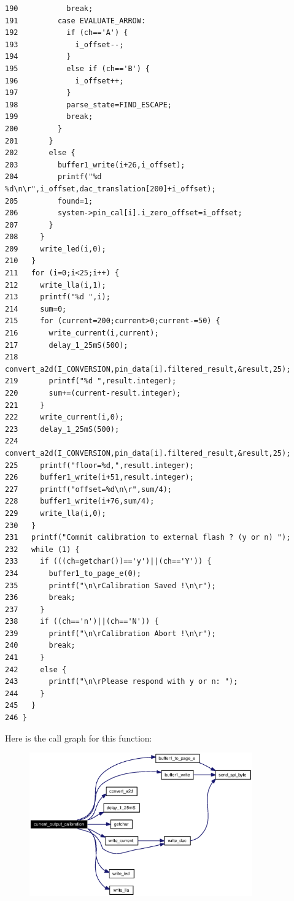 \begin{verbatim}
190           break;
191         case EVALUATE_ARROW: 
192           if (ch=='A') {
193             i_offset--;
194           }
195           else if (ch=='B') {
196             i_offset++;
197           }
198           parse_state=FIND_ESCAPE;
199           break;
200         }
201       }
202       else {
203         buffer1_write(i+26,i_offset);
204         printf("%d %d\n\r",i_offset,dac_translation[200]+i_offset);
205         found=1;
206         system->pin_cal[i].i_zero_offset=i_offset;
207       }
208     }
209     write_led(i,0);
210   }
211   for (i=0;i<25;i++) {
212     write_lla(i,1);
213     printf("%d ",i);
214     sum=0;
215     for (current=200;current>0;current-=50) {
216       write_current(i,current);
217       delay_1_25mS(500);
218       convert_a2d(I_CONVERSION,pin_data[i].filtered_result,&result,25);
219       printf("%d ",result.integer);
220       sum+=(current-result.integer);
221     }
222     write_current(i,0);
223     delay_1_25mS(500);
224     convert_a2d(I_CONVERSION,pin_data[i].filtered_result,&result,25);
225     printf("floor=%d,",result.integer);
226     buffer1_write(i+51,result.integer);
227     printf("offset=%d\n\r",sum/4);
228     buffer1_write(i+76,sum/4);
229     write_lla(i,0);
230   }
231   printf("Commit calibration to external flash ? (y or n) ");
232   while (1) {
233     if (((ch=getchar())=='y')||(ch=='Y')) {
234       buffer1_to_page_e(0);
235       printf("\n\rCalibration Saved !\n\r");
236       break;
237     }
238     if ((ch=='n')||(ch=='N')) {
239       printf("\n\rCalibration Abort !\n\r");
240       break;
241     }
242     else {
243       printf("\n\rPlease respond with y or n: ");
244     }
245   }
246 }
\end{verbatim}\normalsize 




Here is the call graph for this function:\begin{figure}[H]
\begin{center}
\leavevmode
\includegraphics[width=272pt]{calibrate_8h_a0_cgraph}
\end{center}
\end{figure}
